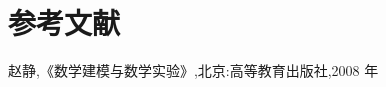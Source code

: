 \documentclass[12pt,a4paper]{article}%
\begin{document}
\newpage
\section{参考文献}

\begin{thebibliography}{100}%

    赵静,《数学建模与数学实验》,北京:高等教育出版社,2008 年
    
   
\end{thebibliography}
\end{document}
